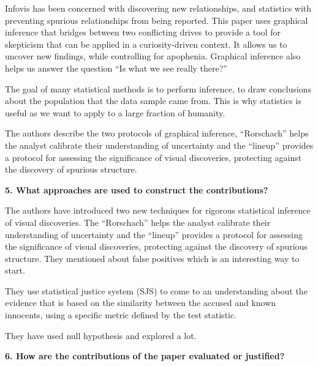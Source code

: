 \documentclass{article}[12pt]
\begin{document}
{

    Infovis has been concerned with discovering new relationships, and statistics with preventing spurious relationships from being reported. This paper uses graphical inference that bridges between two conflicting drives to provide a tool for skepticism that can be applied in a curiosity-driven context. It allows us to uncover new findings, while controlling for apophenia. Graphical inference also helps us answer the question “Is what we see really there?” 
    
    The goal of many statistical methods is to perform inference, to draw conclusions about the population that the data sample came from. This is why statistics is useful as we want to apply to a large fraction of humanity.
    
    The authors describe the two protocols of graphical inference, “Rorschach” helps the analyst calibrate their understanding of uncertainty and the “lineup” provides a protocol for assessing the significance of visual discoveries, protecting against the discovery of spurious structure. 
    
}


\vspace{2ex}\noindent
{\bf 5. What approaches are used to construct the contributions?}

{
    
    The authors have introduced two new techniques for rigorous statistical inference of visual discoveries. The “Rorschach” helps the analyst calibrate their understanding of uncertainty and the “lineup” provides a protocol for assessing the significance of visual discoveries, protecting against the discovery of spurious structure. They mentioned about false positives which is an interesting way to start.
    
    They use statistical justice system (SJS) to come to an understanding about the evidence that is based on the similarity between the accused and known innocents, using a specific metric defined by the test statistic.
    
    They have used null hypothesis and explored a lot.
     

}



\vspace{2ex}\noindent
{\bf 6. How are the contributions of the paper evaluated or justified? }
\end{document}
